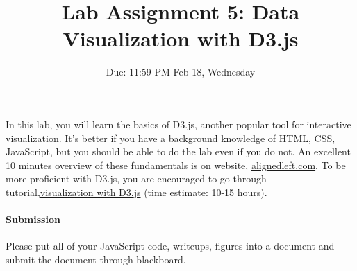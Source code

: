 \documentclass[a4paper, 11pt]{article}
\title{ Lab Assignment 5: Data Visualization with D3.js}
\author{Due: 11:59 PM Feb 18, Wednesday }
\date{}
\begin{document}
\maketitle
In this lab, you will learn the basics of D3.js, another popular tool for interactive visualization. It's better if you have a background knowledge of HTML, CSS, JavaScript, but you should be able to do the lab even if you do not. An excellent 10 minutes overview of these fundamentals is on website, \href{http://alignedleft.com/tutorials/d3/fundamentals}{alignedleft.com}. To be more proficient with D3.js, you are encouraged to go through tutorial,\href{http://alignedleft.com/tutorials/d3}{visualization with D3.js} (time estimate: 10-15 hours).

\paragraph*{Submission} Please put all of your JavaScript code, writeups, figures into a document and submit the document through blackboard.
\end{document}
